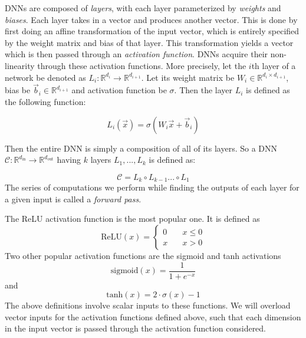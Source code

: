 \documentclass{ociamthesis}
\begin{document}
DNNs are composed of \emph{layers}, with each layer parameterized by
\emph{weights} and \emph{biases}. Each layer takes in a vector and produces
another vector. This is done by first doing an affine transformation of the
input vector, which is entirely specified by the weight matrix and bias of that
layer. This transformation yields a vector which is then passed through an
\emph{activation function}. DNNs acquire their non-linearity through these
activation functions. More precisely, let the $i$th layer of a network be
denoted as $L_i: \mathbb{R}^{d_{i}} \to \mathbb{R}^{d_{i+1}}$. Let its weight
matrix be $W_i \in \mathbb{R}^{d_i \times d_{i+1}}$, bias be $\vec{b}_i \in
\mathbb{R}^{d_{i+1}}$ and activation function be $\sigma$. Then the layer $L_i$
is defined as the following function:

\begin{equation*}
    L_i(\vec{x})
    = \sigma(W_i\vec{x} + \vec{b}_i)
\end{equation*}

Then the entire DNN is simply a composition of all of its layers. So a DNN
$\mathcal{C}: \mathbb{R}^{d_\text{in}} \to \mathbb{R}^{d_\text{out}}$ having $k$
layers $L_1,...,L_k$ is defined as:

\begin{equation*}
    \mathcal{C} = L_k \circ L_{k-1} ... \circ L_1
\end{equation*}
The series of computations we perform while finding the outputs of each layer
for a given input is called a \emph{forward pass}.

The ReLU activation function is the most popular one. It is defined as
\begin{equation*}
    \text{ReLU}(x) = 
    \left\{
        \begin{array}{ll}
            0 & \quad x \leq 0 \\
            x & \quad x > 0
        \end{array}
    \right.
\end{equation*}
Two other popular activation functions are the sigmoid and tanh activations
\begin{equation*}
    \text{sigmoid}(x)=\frac{1}{1+e^{-x}}
\end{equation*} and
\begin{equation*}
    \text{tanh}(x) = 2\cdot\sigma(x) - 1
\end{equation*}
The above definitions involve scalar inputs to these functions. We will overload
vector inputs for the activation functions defined above, such that each
dimension in the input vector is passed through the activation function
considered.
\end{document}
